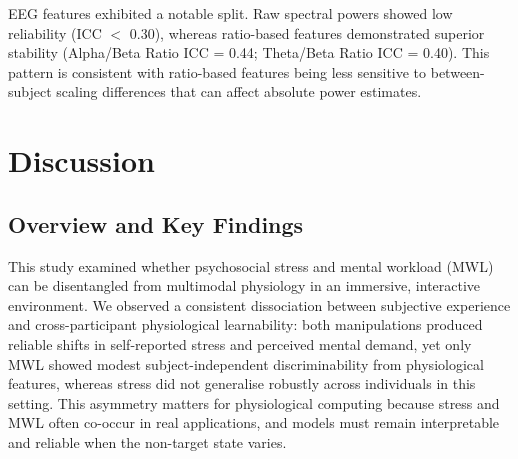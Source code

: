\documentclass[lettersize,journal]{IEEEtran}
\begin{document}
EEG features exhibited a notable split. Raw spectral powers showed low reliability (ICC $<$ 0.30), whereas ratio-based features demonstrated superior stability (Alpha/Beta Ratio ICC = 0.44; Theta/Beta Ratio ICC = 0.40). This pattern is consistent with ratio-based features being less sensitive to between-subject scaling differences that can affect absolute power estimates.


\section{Discussion}

\subsection{Overview and Key Findings}
This study examined whether psychosocial stress and mental workload (MWL) can be disentangled from multimodal physiology in an immersive, interactive environment. We observed a consistent dissociation between subjective experience and cross-participant physiological learnability: both manipulations produced reliable shifts in self-reported stress and perceived mental demand, yet only MWL showed modest subject-independent discriminability from physiological features, whereas stress did not generalise robustly across individuals in this setting. This asymmetry matters for physiological computing because stress and MWL often co-occur in real applications, and models must remain interpretable and reliable when the non-target state varies.
\end{document}

